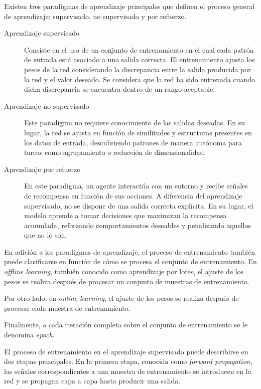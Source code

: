 Existen tres paradigmas de aprendizaje principales que definen el proceso general
de aprendizaje: supervisado, no supervisado y por refuerzo.

\begin{description}
    \item[Aprendizaje supervisado] Consiste en el uso de un conjunto de entrenamiento
    en el cual cada patrón de entrada está asociado a una salida correcta. El entrenamiento
    ajusta los pesos de la red considerando la discrepancia entre la salida producida
    por la red y el valor deseado. Se considera que la red ha sido entrenada cuando
    dicha discrepancia se encuentra dentro de un rango aceptable.

    \item[Aprendizaje no supervisado] Este paradigma no requiere conocimiento de las
    salidas deseadas. En su lugar, la red se ajusta en función de similitudes y estructuras
    presentes en los datos de entrada, descubriendo patrones de manera autónoma para
    tareas como agrupamiento o reducción de dimensionalidad.

    \item[Aprendizaje por refuerzo] En este paradigma, un agente interactúa con un entorno
    y recibe señales de recompensa en función de sus acciones. A diferencia del aprendizaje
    supervisado, no se dispone de una salida correcta explícita. En su lugar, el modelo
    aprende a tomar decisiones que maximizan la recompensa acumulada, reforzando
    comportamientos deseables y penalizando aquellos que no lo son.
\end{description}

En adición a los paradigmas de aprendizaje, el proceso de entrenamiento también
puede clasificarse en función de cómo se procesa el conjunto de entrenamiento.
En \textit{offline learning}, también conocido como aprendizaje por lotes, el
ajuste de los pesos se realiza después de procesar un conjunto de muestras de
entrenamiento.
\medskip

Por otro lado, en \textit{online learning}, el ajuste de los pesos se realiza
después de procesar cada muestra de entrenamiento.
\medskip

Finalmente, a cada iteración completa sobre el conjunto de entrenamiento se le
denomina \textit{epoch}.
\medskip

El proceso de entrenamiento en el aprendizaje supervisado puede describirse en dos
etapas principales. En la primera etapa, conocida como \textit{forward propagation},
las señales correspondientes a una muestra de entrenamiento se introducen en la red
y se propagan capa a capa hasta producir una salida.
\medskip

